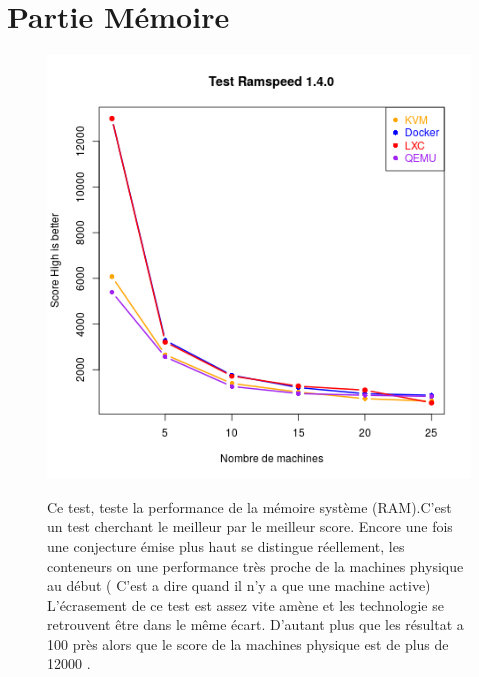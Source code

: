 \section{Partie Mémoire}
\begin{figure}[h]
   \begin{minipage}[c]{.46\linewidth}
	   \includegraphics[scale=0.5]{resultats/ramspeed.png}
   \end{minipage} \hfill
   \begin{minipage}[c]{.46\linewidth}
     Ce test, teste la performance de la mémoire système (RAM).C'est un test cherchant le meilleur par le meilleur score. Encore une fois une conjecture émise plus haut se distingue réellement, les conteneurs on une performance très proche de la machines physique au début ( C'est a dire quand il n'y a que une machine active) L’écrasement de ce test est assez vite amène et les technologie se retrouvent être dans le même écart. D'autant plus que les résultat a 100 près alors que le score de la machines physique est de plus de 12000 .
   \end{minipage}
\end{figure}

